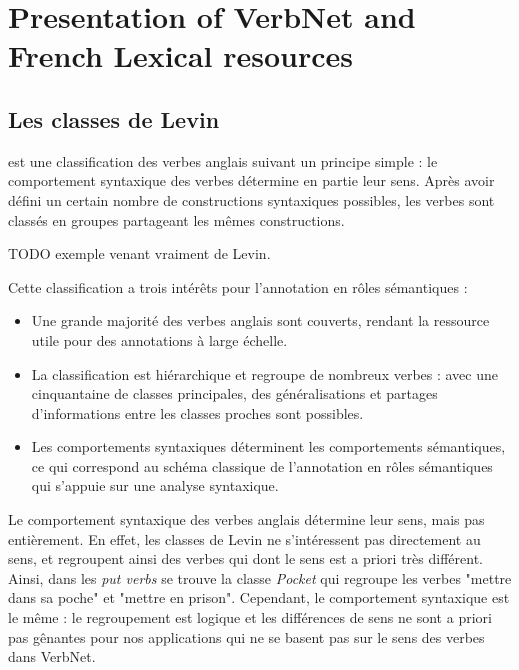 \section{Presentation of VerbNet and French Lexical resources}\label{french}

\subsection{Les classes de Levin}


\cite{levin1993english} est une classification des verbes anglais suivant un
principe simple : le comportement syntaxique des verbes détermine en partie
leur sens. Après avoir défini un certain nombre de constructions syntaxiques
possibles, les verbes sont classés en groupes partageant les mêmes
constructions.

TODO exemple venant vraiment de Levin.

Cette classification a trois intérêts pour l'annotation en rôles sémantiques :

\begin{itemize}

    \item Une grande majorité des verbes anglais sont couverts, rendant la
        ressource utile pour des annotations à large échelle.

    \item La classification est hiérarchique et regroupe de nombreux verbes :
        avec une cinquantaine de classes principales, des généralisations et
        partages d'informations entre les classes proches sont possibles.

    \item Les comportements syntaxiques déterminent les comportements
        sémantiques, ce qui correspond au schéma classique de l'annotation en
        rôles sémantiques qui s'appuie sur une analyse syntaxique.

\end{itemize}



Le comportement syntaxique des verbes anglais détermine leur sens, mais pas
entièrement. En effet, les classes de Levin ne s'intéressent pas directement au
sens, et regroupent ainsi des verbes qui dont le sens est a priori très
différent. Ainsi, dans les \textit{put verbs} se trouve la classe
\textit{Pocket} qui regroupe les verbes "mettre dans sa poche" et "mettre en
prison". Cependant, le comportement syntaxique est le même : le regroupement
est logique et les différences de sens ne sont a priori pas gênantes pour nos
applications qui ne se basent pas sur le sens des verbes dans VerbNet.

